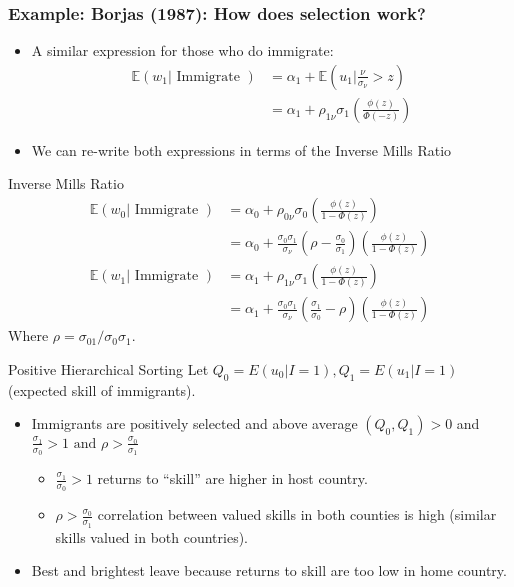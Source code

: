 \documentclass[aspectratio=169,11pt]{beamer}
\begin{document}
\begin{frame}
\frametitle{Example: Borjas (1987): How does selection work?}
\begin{itemize}
\item A similar expression for those who do immigrate:
\begin{align*}
\mathbb{E}\left(w_{1} | \text { Immigrate }\right) &=\alpha_{1}+\mathbb{E}\left(u_{1} | \frac{\nu}{\sigma_{\nu}}>z\right) \\
&=\alpha_{1}+\rho_{1 \nu} \sigma_{1}\left(\frac{\phi(z)}{\Phi(-z)}\right)
\end{align*}
\item We can re-write both expressions in terms of the \alert{Inverse Mills Ratio}
\end{itemize}
\end{frame}

\begin{frame}{Inverse Mills Ratio}
\begin{align*}
\mathbb{E}\left(w_{0} | \text { Immigrate }\right) &=\alpha_{0}+\rho_{0 \nu} \sigma_{0}\left(\frac{\phi(z)}{1-\Phi(z)}\right) \\
&=\alpha_{0}+\frac{\sigma_{0} \sigma_{1}}{\sigma_{\nu}}\left(\rho-\frac{\sigma_{0}}{\sigma_{1}}\right)\left(\frac{\phi(z)}{1-\Phi(z)}\right) \\
\mathbb{E}\left(w_{1} | \text { Immigrate }\right) &=\alpha_{1}+\rho_{1 \nu} \sigma_{1}\left(\frac{\phi(z)}{1-\Phi(z)}\right) \\
&=\alpha_{1}+\frac{\sigma_{0} \sigma_{1}}{\sigma_{\nu}}\left(\frac{\sigma_{1}}{\sigma_{0}}-\rho\right)\left(\frac{\phi(z)}{1-\Phi(z)}\right)
\end{align*}
Where $\rho=\sigma_{01} / \sigma_{0} \sigma_{1}$.
\end{frame}



\begin{frame}{Positive Hierarchical Sorting}
Let $Q_{0}=E\left(u_{0} | I=1\right), Q_{1}=E\left(u_{1} | I=1\right)$ (expected \alert{skill} of immigrants).
\begin{itemize}
\item Immigrants are positively selected and above average $(Q_0,Q_1) > 0$ and $\frac{\sigma_{1}}{\sigma_{0}}>1 \text { and } \rho>\frac{\sigma_{0}}{\sigma_{1}}$
\begin{itemize}
\item $\frac{\sigma_{1}}{\sigma_{0}}>1$ returns to ``skill'' are higher in host country.
\item $\rho>\frac{\sigma_{0}}{\sigma_{1}}$ correlation between valued skills in both counties is high (similar skills valued in both countries).
\end{itemize}
\item Best and brightest leave because returns to skill are too low in home country.
\end{itemize}
\end{frame}
\end{document}
